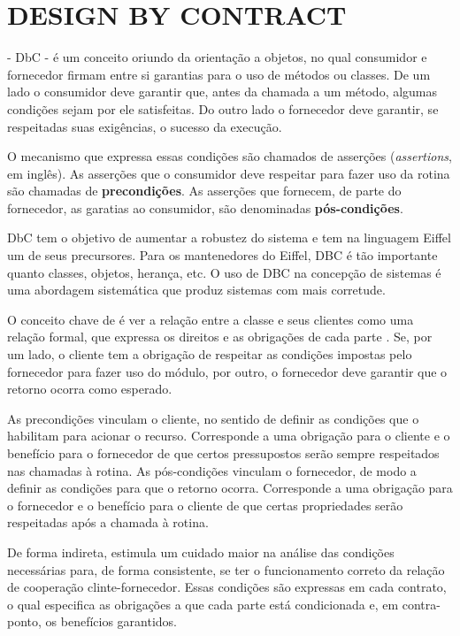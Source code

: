 \section{DESIGN BY CONTRACT}
\label{Design-by-Contract}
\vspace{-6mm}

\designbycontract{} \cite{meyer1992applying} - DbC - é um conceito
oriundo da orientação a objetos, no qual consumidor e fornecedor firmam entre si garantias para
o uso de métodos ou classes. De um lado o consumidor deve garantir que, antes da
chamada a um método, algumas condições sejam por ele satisfeitas.
Do outro lado o fornecedor deve garantir, se respeitadas suas exigências,
o sucesso da execução.

O mecanismo que expressa essas condições são chamados de asserções
(\textit{assertions}, em inglês). As asserções que o consumidor deve respeitar
para fazer uso da rotina são chamadas de \textbf{precondições}. As asserções que
fornecem, de parte do fornecedor, as garatias ao consumidor, são denominadas
\textbf{pós-condições}.

DbC tem o objetivo de aumentar a robustez do sistema e tem na linguagem Eiffel
\cite{meyer1988eiffel} um de seus precursores. Para os mantenedores do Eiffel, DBC é
tão importante quanto classes, objetos, herança, etc. O uso de DBC na
concepção de sistemas é uma abordagem sistemática que produz sistemas com mais
corretude.

O conceito chave de \designbycontract{} é ver a relação entre a classe e
seus clientes como uma relação formal, que expressa os direitos e as
obrigações de cada parte \cite{meyer1997object}. Se, por um lado, o
cliente tem a obrigação de respeitar as condições impostas pelo fornecedor para fazer uso do módulo, por
outro, o fornecedor deve garantir que o retorno ocorra como esperado.

As precondições vinculam o cliente, no sentido de definir as condições que
o habilitam para acionar o recurso. Corresponde a uma obrigação para o cliente e
o benefício para o fornecedor \cite{meyer1997object} de que certos
pressupostos serão sempre respeitados nas chamadas à rotina.
As pós-condições vinculam o fornecedor, de modo a definir as condições para que o retorno ocorra.
Corresponde a uma obrigação para o fornecedor e o benefício para o cliente de
que certas propriedades serão respeitadas após a chamada à rotina.

De forma indireta, \designbycontract{} estimula um cuidado maior na análise das
condições necessárias para, de forma consistente, se ter o funcionamento correto
da relação de cooperação clinte-fornecedor.
Essas condições são expressas em cada contrato, o qual especifica as obrigações
a que cada parte está condicionada e, em contra-ponto, os benefícios garantidos.

